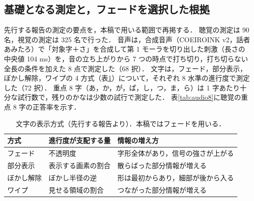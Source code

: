 \subsection{基礎となる測定と，フェードを選択した根拠}

先行する報告\cite{maruyama2026wiss}の測定の要点を，本稿で用いる範囲で再掲する．
聴覚の測定は 90 名，視覚の測定は 325 名で行った．
音声は，合成音声（COEIROINK v2，話者あみたろ）で「対象字＋さ」を合成して第 1 モーラを切り出した刺激（長さの中央値 104 ms）を，音の立ち上がりから 7 つの時点で打ち切り，打ち切らない全長の条件を加えた 8 点で測定した（68 択）．
文字は，フェード，部分表示，ぼかし解除，ワイプの 4 方式（表\ref{tab:methods}）について，それぞれ 8 水準の進行度で測定した（72 択）．
重点 8 字（あ，か，が，ぱ，し，つ，ま，ら）は 1 字あたり十分な試行数で，残りのかなは少数の試行で測定した．
表\ref{tab:audio8}に聴覚の重点 8 字の正答率を示す．

\begin{table}[tb]
\caption{文字の表示方式（先行する報告\cite{maruyama2026wiss}より）．本稿ではフェードを用いる．}
\label{tab:methods}
\centering
\footnotesize
\begin{tabular}{p{1.5cm}p{2.3cm}p{3.6cm}}
\hline\hline
方式 & 進行度が支配する量 & 情報の増え方 \\
\hline
フェード & 不透明度 & 字形全体があり，信号の強さが上がる \\
部分表示 & 表示する画素の割合 & 散らばった部分情報が増える \\
ぼかし解除 & ぼかし半径の逆 & 形は最初からあり，細部が後から入る \\
ワイプ & 見せる領域の割合 & つながった部分情報が増える \\
\hline
\end{tabular}
\end{table}


